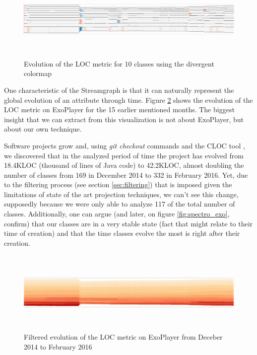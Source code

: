 \begin{figure}[H]
	\centering
	\includegraphics[width=1.0\textwidth,height=4.0cm]{figures/stream_10_loc_div.png}
	\caption{Evolution of the LOC metric for 10 classes using the divergent colormap}
	\label{fig:stream_10_loc_div}
\end{figure}

One characteristic of the Streamgraph is that it can naturally represent the global evolution of an attribute through time. Figure \ref{fig:stream_all_loc} shows the evolution of the LOC metric on ExoPlayer for the 15 earlier mentioned months. The biggest insight that we can extract from this visualization is not about ExoPlayer, but about our own technique.

Software projects grow and, using \textit{git checkout} commands and the CLOC tool %
, we discovered that in the analyzed period of time the project has evolved from 18.4KLOC (thousand of lines of Java code) to 42.2KLOC, almost doubling the number of classes from 169 in December 2014 to 332 in February 2016. Yet, due to the filtering process (see section \ref{sec:filtering}) that is imposed given the limitations of state of the art projection techniques, we can't see this change, supposedly because we were only able to analyze 117 of the total number of classes. Additionally, one can argue (and later, on figure \ref{fig:spectro_exo}, confirm) that our classes are in a very stable state (fact that might relate to their time of creation) and that the time classes evolve the most is right after their creation.

\begin{figure}[H]
  \centering
  \includegraphics[width=1.0\textwidth,height=4.0cm]{figures/stream_all_loc.png}
  \caption{Filtered evolution of the LOC metric on ExoPlayer from Deceber 2014 to February 2016}
  \label{fig:stream_all_loc}
\end{figure}

